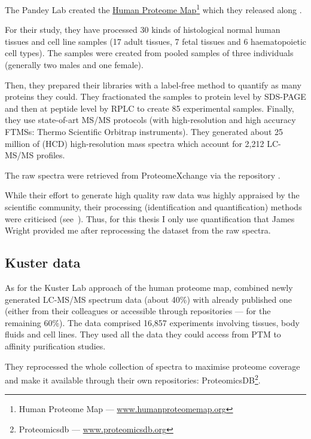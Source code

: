 The Pandey Lab \citep{PandeyData} created the
\href{http://www.humanproteomemap.org/}%
{Human Proteome Map}\footnote{Human Proteome Map --- %
\href{http://www.humanproteomemap.org/}{www.humanproteomemap.org}} which
they released along .

For their study, they have processed 30 kinds of histological normal human
tissues and cell line samples (17 adult tissues, 7 fetal tissues and 6
haematopoietic cell types). The samples were created from pooled samples of three
individuals (generally two males and one female).

Then, they prepared their libraries with a label-free method to quantify
as many proteins they could. They fractionated the samples to protein level by
\gls{SDS-PAGE} and then at peptide level by \gls{RPLC} to create 85 experimental
samples. Finally, they use state-of-art \gls{MS/MS} protocols
(with high-resolution and high accuracy \glspl{FTMS}:
Thermo Scientific Orbitrap instruments).
They generated about 25 million of (\gls{HCD})
high-resolution mass spectra which account for 2,212 \gls{LC-MS/MS} profiles.

The raw spectra were retrieved from ProteomeXchange via the repository
.

While their effort to generate high quality raw data was highly appraised
by the scientific community, their processing
(identification and quantification) methods were
criticised (see~\cite{Ezkurdia2014-qx}). Thus, for this thesis I only use
quantification that James Wright provided me after reprocessing the dataset
from the raw spectra.

\subsection{Kuster data}

As for the Kuster Lab approach of the human proteome map,
\cite{KusterData} combined newly generated \gls{LC-MS/MS} spectrum
data (about 40\%) with already published one
(either from their colleagues or accessible through repositories ---
for the remaining 60\%).
The data comprised 16,857 experiments involving tissues, body fluids and cell
lines. They used all the data they could access from \gls{PTM} to affinity
purification studies.

They reprocessed the whole collection of spectra to maximise proteome coverage
and make it available through their own repositories: ProteomicsDB\footnote{%
Proteomicsdb --- %
\href{https://www.proteomicsdb.org/}{www.proteomicsdb.org}}.

